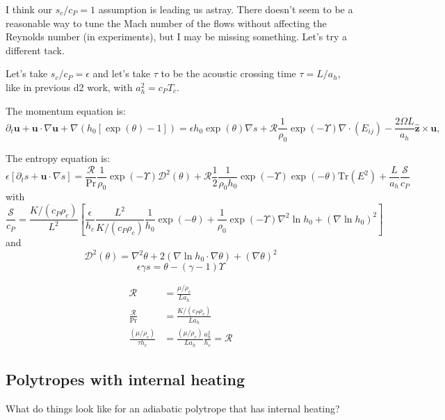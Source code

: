 \documentclass{aastex631}
\newcommand{\del}{\nabla}
\renewcommand{\vec}{\boldsymbol}
\newcommand{\scrD}{\mathcal{D}}
\newcommand{\scrR}{\mathcal{R}}
\newcommand{\scrS}{\mathcal{S}}
\begin{document}
I think our $s_c/c_P = 1$ assumption is leading us astray.  There doesn't seem to be a reasonable way to tune the Mach number of the flows without affecting the Reynolds number (in experiments), but I may be missing something.  Let's try a different tack.

Let's take $s_c/c_P = \epsilon$ and let's take $\tau$ to be the acoustic crossing time $\tau = L/a_h$, like in previous d2 work, with $a_h^2 = c_P T_c$.

The momentum equation is:
\begin{equation}
  \partial_t \vec{u} + \vec{u}\cdot \del \vec{u} + \del (h_0[\exp(\theta)-1]) =
  \epsilon h_0\exp(\theta)\del s + \scrR \frac{1}{\rho_0}\exp(-\Upsilon)\del\cdot (E_{ij}) - \frac{2 \Omega L}{a_h} \vec{\hat{z}} \times \vec{u},
\end{equation}

The entropy equation is:
\begin{equation}
  \epsilon \left[\partial_t s + \vec{u}\cdot \del s \right] =
  \frac{\scrR}{\mathrm{Pr}}\frac{1}{\rho_0} \exp(-\Upsilon)\scrD^2(\theta)
  + \scrR \frac{1}{2}\frac{1}{\rho_0 h_0}\exp(-\Upsilon) \exp(-\theta)\mathrm{Tr}(E^2)
  + \frac{L}{a_h} \frac{\scrS}{c_P}
\end{equation}
with
\begin{equation}
\frac{\scrS}{c_P} = \frac{K/(c_P \rho_c)}{L^2} \left[\frac{\epsilon}{h_c} \frac{L^2}{K/(c_P \rho_c)}\frac{1}{h_0}\exp(-\theta) +  \frac{1}{\rho_0} \exp(-\Upsilon) \nabla^2 \ln h_0 + (\nabla \ln h_0)^2 \right]
\end{equation}
and
\begin{equation}
\scrD^2(\theta) = \nabla^2 \theta + 2\left(\nabla \ln h_0 \cdot \nabla \theta \right) + \left(\nabla \theta \right)^2
\end{equation}
\begin{equation}
  \epsilon \gamma s = \theta - (\gamma-1)\Upsilon
\end{equation}

\begin{align}
  \scrR &= \frac{\mu/\rho_c}{L a_h}\\
  \frac{\scrR}{\mathrm{Pr}} &= \frac{K/(c_P \rho_c)}{L a_h} \\
  \frac{(\mu/\rho_c)}{\tau h_c} &= \frac{(\mu/\rho_c)}{L a_h} \frac{a_h^2}{h_c} = \scrR
\end{align}

\subsection{Polytropes with internal heating}
What do things look like for an adiabatic polytrope that has internal heating?
\end{document}
